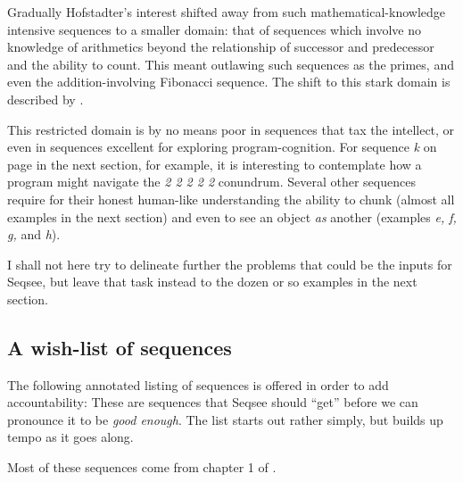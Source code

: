\documentclass[letterpaper]{article}
\begin{document}
Gradually Hofstadter's interest shifted away from such mathematical-knowledge intensive sequences to a smaller domain: that of sequences which involve no knowledge of arithmetics beyond the relationship of successor and predecessor and the ability to count. This meant outlawing such sequences as the primes, and even the addition-involving Fibonacci sequence. The shift to this stark domain is described by .

This restricted domain is by no means poor in sequences that tax the intellect, or even in sequences excellent for exploring program-cognition. For sequence \emph{k} on page \pageref{seq:k} in the next section, for example, it is interesting to contemplate how a program might navigate the \emph{2 2 2 2 2} conundrum. Several other sequences require for their honest human-like understanding the ability to chunk (almost all examples in the next section) and even to see an object \emph{as} another (examples \emph{e, f, g, } and \emph{h}).

I shall not here try to delineate further the problems that could be the inputs for Seqsee, but leave that task instead to the dozen or so examples in the next section.

\subsection{A wish-list of sequences}
\label{sec:list}

The following annotated listing of sequences is offered in order to add accountability: These are sequences that Seqsee should ``get'' before we can pronounce it to be \emph{good enough}. The list starts out rather simply, but builds up tempo as it goes along.

Most of these sequences come from chapter 1 of .
\end{document}
